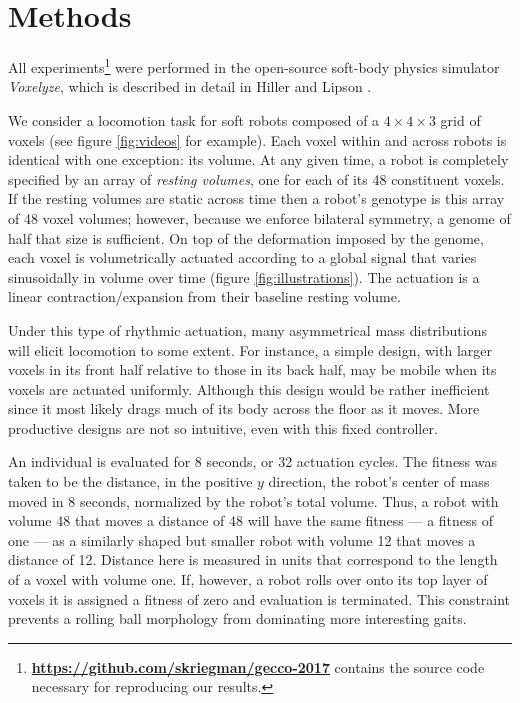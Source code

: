 \section{Methods}
\label{sec:methods}


All experiments\footnote{\href{https://github.com/skriegman/gecco-2017}{\textbf{https://github.com/skriegman/gecco-2017}} contains the source code necessary for reproducing our results.} were performed in the open-source soft-body physics simulator  
\textit{Voxelyze}, which is described in detail in Hiller and Lipson \cite{hiller2014dynamic}.

We consider a locomotion task for soft robots composed of a $4\times4\times3$ grid of voxels (see figure \ref{fig:videos} for example). 
Each voxel within and across robots is identical with one exception:
its volume.
At any given time, a robot is completely specified by an array of \textit{resting volumes}, one for each of its 48 constituent voxels.
If the resting volumes are static across time then a robot's genotype is this array of 48 voxel volumes; however, because we enforce bilateral symmetry, a genome of half that size is sufficient.
On top of the deformation imposed by the genome, each voxel is volumetrically actuated according to a global signal that varies sinusoidally in volume over time (figure \ref{fig:illustrations}). The actuation is a linear contraction/expansion from their baseline resting volume.

Under this type of rhythmic actuation, many asymmetrical mass distributions will elicit locomotion to some extent. For instance, a simple design, with larger voxels in its front half relative to those in its back half, may be mobile when its voxels are actuated uniformly. Although this design would be rather inefficient since it most likely drags much of its body across the floor as it moves. More productive designs are not so intuitive, even with this fixed controller.

An individual is evaluated for 8 seconds, or 32 actuation cycles.
The fitness was taken to be the distance, in the positive $y$ direction, the robot's center of mass moved in 8 seconds, normalized by the robot's total volume.
Thus, a robot with volume 48 that moves a distance of 48 will have the same fitness --- a fitness of one --- as a similarly shaped but smaller robot with volume 12 that moves a distance of 12. 
Distance here is measured in units that correspond to the length of a voxel with volume one.
If, however, a robot rolls over onto its top layer of voxels it is assigned a fitness of zero and evaluation is terminated. This constraint prevents a rolling ball morphology from dominating more interesting gaits.

